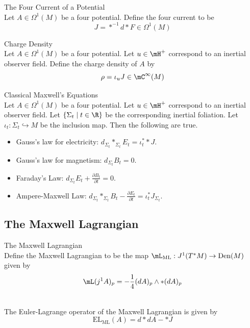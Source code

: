 \documentclass[a4paper]{article}
\begin{document}
\begin{defn}{The Four Current of a Potential}{}\\
Let $A\in\Omega^1(M)$ be a four potential. Define the four current to be $$J=\ast^{-1}d\ast F\in\Omega^1(M)$$
\end{defn}

\begin{defn}{Charge Density}{}\\
Let $A\in\Omega^1(M)$ be a four potential. Let $u\in\mH^+$ correspond to an inertial observer field. Define the charge density of $A$ by $$\rho=\iota_u J\in\mC^\infty(M)$$
\end{defn}

\begin{thm}{Classical Maxwell's Equations}{}\\
Let $A\in\Omega^1(M)$ be a four potential. Let $u\in\mH^+$ correspond to an inertial observer field. Let $\{\Sigma_t\;|\;t\in\R\}$ be the corresponding inertial foliation. Let $\iota_t:\Sigma_t\hookrightarrow M$ be the inclusion map. Then the following are true. 
\begin{itemize}
\item Gauss's law for electricity: $d_{\Sigma_t}\ast_{\Sigma_t}E_t=\iota_t^\ast\ast J$. 
\item Gauss's law for magnetism: $d_{\Sigma_t}B_t=0$. 
\item Faraday's Law: $d_{\Sigma_t}E_t+\frac{\partial B_t}{\partial t}=0$. 
\item Ampere-Maxwell Law: $d_{\Sigma_t}\ast_{\Sigma_t}B_t-\frac{\partial E_t}{\partial t}=\iota_t^\ast J_{\Sigma_t}$. 
\end{itemize}
\end{thm}

\subsection{The Maxwell Lagrangian}
\begin{defn}{The Maxwell Lagrangian}{}\\
Define the Maxwell Lagrangian to be the map $\mL_\text{ML}:J^1(T^\ast M)\to\text{Den}(M)$ given by $$\mL(j^1A)_p=-\frac{1}{4}(dA)_p\wedge\ast(dA)_p$$
\end{defn}

\begin{prp}{}{}\\
The Euler-Lagrange operator of the Maxwell Lagrangian is given by $$\text{EL}_\text{ML}(A)=d\ast dA-\ast J$$
\end{prp}
\end{document}
